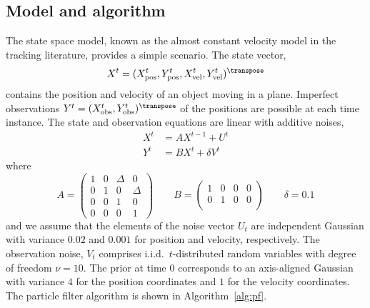\subsection{Model and algorithm}
\label{sub:Model and algorithm}

The state space model, known as the almost constant velocity model in the
tracking literature, provides a simple scenario. The state vector,
\begin{equation*}
  X^t = (\xpos^t, \ypos^t, \xvel^t, \yvel^t)^{\transpose}
\end{equation*}
contains the position and velocity of an object moving in a plane. Imperfect
observations $Y^t = (\xobs^t, \yobs^t)^{\transpose}$ of the positions are
possible at each time instance. The state and observation equations are linear
with additive noises,
\begin{align*}
  X^t &= AX^{t-1} + U^t \\
  Y^t &= BX^t + \delta V^t
\end{align*}
where
\begin{equation*}
  A = \begin{pmatrix}
    1 & 0 & \Delta & 0      \\
    0 & 1 & 0      & \Delta \\
    0 & 0 & 1      & 0      \\
    0 & 0 & 0      & 1
  \end{pmatrix} \qquad
  B = \begin{pmatrix}
    1 & 0 & 0 & 0 \\
    0 & 1 & 0 & 0 \\
  \end{pmatrix} \qquad
  \delta = 0.1
\end{equation*}
and we assume that the elements of the noise vector $U_t$ are independent
Gaussian with variance $0.02$ and $0.001$ for position and velocity,
respectively. The observation noise, $V_t$ comprises i.i.d.\ $t$-distributed
random variables with degree of freedom $\nu = 10$. The prior at time $0$
corresponds to an axis-aligned Gaussian with variance $4$ for the position
coordinates and $1$ for the velocity coordinates. The particle filter algorithm
is shown in Algorithm~\ref{alg:pf}.

